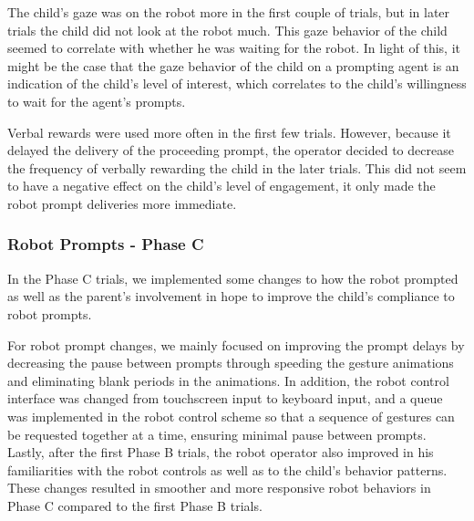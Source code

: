 \documentclass{ut-thesis}
\providecommand{\DIFaddtex}[1]{{\protect\color{blue}\uwave{#1}}} %
\providecommand{\DIFaddbegin}{} %
\providecommand{\DIFaddend}{} %
\providecommand{\DIFadd}[1]{\texorpdfstring{\DIFaddtex{#1}}{#1}} %
\begin{document}
The child's gaze was on the robot more in the first couple of trials, but in later trials the child did not look at the robot much.  This gaze behavior of the child seemed to correlate with whether he was waiting for the robot.  In light of this, it might be the case that the gaze behavior of the child on a prompting agent is an indication of the child's level of interest, which correlates to the child's willingness to wait for the agent's prompts.

Verbal rewards were used more often in the first few trials.  However, because it delayed the delivery of the proceeding prompt, the operator decided to decrease the frequency of verbally rewarding the child in the later trials.  This did not seem to have a negative effect on the child's level of engagement, it only made the robot prompt deliveries more immediate.

\subsubsection{Robot \DIFaddbegin \DIFadd{Parent Joint }\DIFaddend Prompts - Phase C}
In the Phase C trials, we implemented some changes to how the robot prompted as well as the parent's involvement in hope to improve the child's compliance to robot prompts.

For robot prompt changes, we mainly focused on improving the prompt delays by decreasing the pause between prompts through speeding the gesture animations and eliminating blank periods in the animations.  In addition, the robot control interface was changed from touchscreen input to keyboard input, and a queue was implemented in the robot control scheme so that a sequence of gestures can be requested together at a time, ensuring minimal pause between prompts.  Lastly, after the first Phase B trials, the robot operator also improved in his familiarities with the robot controls as well as to the child's behavior patterns.  These changes resulted in smoother and more responsive robot behaviors in Phase C compared to the first Phase B trials.
\end{document}
